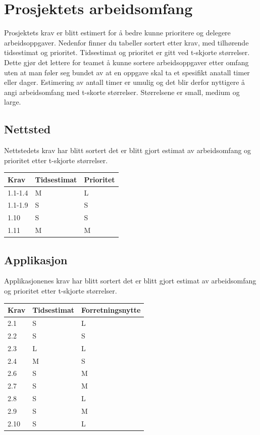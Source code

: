 \documentclass[norsk]{article}
\begin{document}
\section{Prosjektets arbeidsomfang}
Prosjektets krav er blitt estimert for å bedre kunne prioritere og delegere arbeidsoppgaver. Nedenfor finner du tabeller sortert etter krav, med tilhørende tidsestimat og prioritet.\newline
Tidsestimat og prioritet er gitt ved t-skjorte størrelser. Dette gjør det lettere for teamet å kunne sortere arbeidsoppgaver etter omfang uten at man føler seg bundet av at en oppgave skal ta et spesifikt anatall timer eller dager. Estimering av antall timer er umulig og det blir derfor nyttigere å angi arbeidsomfang med t-skorte størrelser. Størrelsene er small, medium og large.
\subsection{Nettsted}
Nettstedets krav har blitt sortert det er blitt gjort estimat av arbeidsomfang og prioritet etter t-skjorte størrelser.
\begin{table}[ht]
\begin{tabular}{|l|l|l|}
\hline
Krav              & Tidsestimat & Prioritet \\ \hline
1.1-1.4 & M           & L         \\ \hline
1.1-1.9     & S           & S         \\ \hline
1.10              & S           & S         \\ \hline
1.11              & M           & M         \\ \hline
\end{tabular}
\end{table}
\subsection{Applikasjon}
Applikasjonenes krav har blitt sortert det er blitt gjort estimat av arbeidsomfang og prioritet etter t-skjorte størrelser.
\begin{table}[ht]
\begin{tabular}{|l|l|l|}
\hline
Krav & Tidsestimat & Forretningsnytte \\ \hline
2.1  & S           & L               \\ \hline
2.2  & S           & S               \\ \hline
2.3  & L           & L               \\ \hline
2.4  & M           & S               \\ \hline
2.6  & S           & M               \\ \hline
2.7  & S           & M               \\ \hline
2.8  & S           & L               \\ \hline
2.9  & S           & M               \\ \hline
2.10 & S           & L               \\ \hline
\end{tabular}
\end{table}
\end{document}
